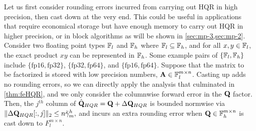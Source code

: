 Let us first consider rounding errors incurred from carrying out HQR in high precision, then cast down at the very end.
This could be useful in applications that require economical storage but have enough memory to carry out HQR in higher precision, or in block algorithms as will be shown in \cref{sec:mp-3,sec:mp-2}.
Consider two floating point types $\mathbb{F}_{l}$ and $\mathbb{F}_{h}$ where $\mathbb{F}_{l}\subseteq \mathbb{F}_{h}$, and for all $x,y\in\mathbb{F}_{l}$, the exact product $xy$ can be represented in $\mathbb{F}_{h}$.
Some example pairs of $\{\mathbb{F}_{l}, \mathbb{F}_{h}\}$ include $\{\text{fp16}, \text{fp32}\}$, $\{\text{fp32}, \text{fp64}\}$, and $\{\text{fp16}, \text{fp64}\}$.
Suppose that the matrix to be factorized is stored with low precision numbers, $\mathbf{A}\in\mathbb{F}_{l}^{m\times n}$.
Casting up adds no rounding errors, so we can directly apply the analysis that culminated in \cref{thm:feHQR}, and we only consider the columnwise forward error in the $\mathbf{Q}$ factor.
Then, the $j^{th}$ column of $\hat{\mathbf{Q}}_{HQR} = \mathbf{Q} + \Delta \mathbf{Q}_{HQR}$ is bounded normwise via $\|\Delta \mathbf{Q}_{HQR}[:,j]\|_2 \leq n\tilde{\gamma}_{m}^{h},$ and incurs an extra rounding error when $\mathbf{Q}\in\mathbb{F}_{h}^{m\times n}$ is cast down to $F_{l}^{m\times n}$.\par

